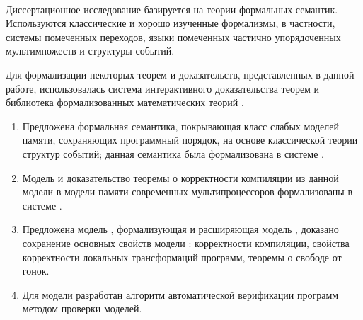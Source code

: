 ~\newline

{\methods}

Диссертационное исследование базируется на теории формальных семантик. 
Используются классические и хорошо изученные формализмы, в частности, 
системы помеченных переходов, языки помеченных частично упорядоченных мультимножеств и структуры событий. 

Для формализации некоторых теорем и доказательств, представленных в данной работе, 
использовалась система интерактивного доказательства теорем \coq 
и библиотека формализованных математических теорий \mathcomp.


{}
\begin{enumerate}[beginpenalty=10000] %
  \item Предложена формальная семантика, 
    покрывающая класс слабых моделей памяти, сохраняющих программный порядок, на основе классической теории структур событий;
    данная семантика была формализована в системе \coq.
  \item Модель \Wkm и доказательство теоремы о корректности компиляции
    из данной модели в модели памяти современных мультипроцессоров формализованы в системе \coq.
  \item Предложена модель \WkmS, формализующая и  расширяющая модель \Wkm,  доказано сохранение основных свойств модели \Wkm: корректности компиляции,
    свойства корректности локальных трансформаций программ,
    теоремы о свободе от гонок.
  \item Для модели \WkmS разработан алгоритм автоматической 
    верификации программ методом проверки моделей.
\end{enumerate}

